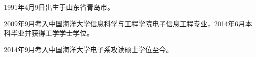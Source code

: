 \begin{resume}

  
  1991年4月9日出生于山东省青岛市。
  
  2009年9月考入中国海洋大学信息科学与工程学院电子信息工程专业，2014年6月本科毕业并获得工学学士学位。
  
  2014年9月考入中国海洋大学电子系攻读硕士学位至今。

\end{resume}
